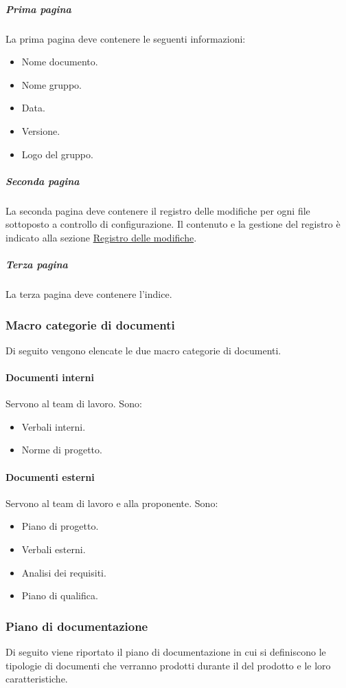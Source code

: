 \subparagraph{Prima pagina}
La prima pagina deve contenere le seguenti informazioni:
\begin{itemize}
    \item Nome documento.     
    \item Nome gruppo.
    \item Data. 
    \item Versione.
    \item Logo del gruppo.
\end{itemize}

\subparagraph{Seconda pagina}
La seconda pagina deve contenere il registro delle modifiche per ogni file sottoposto a controllo di configurazione.
Il contenuto e la gestione del registro è indicato alla sezione \hyperref[par:registro_delle_modifiche]{Registro delle modifiche}.

\subparagraph{Terza pagina}
La terza pagina deve contenere l'indice.

\subsubsection{Macro categorie di documenti}
Di seguito vengono elencate le due macro categorie di documenti. 

\paragraph{Documenti interni}
Servono al team di lavoro.
Sono:
\begin{itemize}
    \item Verbali interni.
    \item Norme di progetto.
\end{itemize}

\paragraph{Documenti esterni}
Servono al team di lavoro e alla proponente.
Sono:
\begin{itemize}
    \item Piano di progetto.
    \item Verbali esterni.
    \item Analisi dei requisiti.
    \item Piano di qualifica.
\end{itemize}

\subsubsection{Piano di documentazione}
Di seguito viene riportato il piano di documentazione in cui si definiscono le tipologie di documenti che verranno prodotti durante il  del prodotto e le loro caratteristiche.

